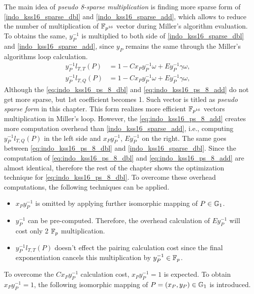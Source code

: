 The main idea of  \textit{pseudo 8-sparse multiplication} is finding more sparse form  of \eqref{indo_kss16_sparse_dbl} and \eqref{indo_kss16_sparse_add}, which allows to reduce the number of multiplication of $\mathbb{F}_{p^{16}}$ vector during Miller's algorithm evaluation.  To obtains the same, $y_P^{-1}$ is multiplied to both side of  \eqref{indo_kss16_sparse_dbl} and \eqref{indo_kss16_sparse_add}, since $y_P$  remains the same through the Miller's algorithms loop calculation.
\begin{subequations}
\begin{eqnarray}
y_{P}^{-1}l_{T,T}(P)& =  1 -Cx_{P}y_{P}^{-1}\omega+E y_{P}^{-1}\gamma \omega,  \label{eq:indo_kss16_ps_8_dbl}\\
y_{P}^{-1}l_{T,Q}(P)& =  1 -Cx_{P}y_{P}^{-1}\omega+E y_{P}^{-1}\gamma \omega, \label{eq:indo_kss16_ps_8_add}
\end{eqnarray}
\end{subequations}
Although the \eqref{eq:indo_kss16_ps_8_dbl} and \eqref{eq:indo_kss16_ps_8_add} do not get more sparse, but 1st coefficient becomes 1. 
Such vector is titled as \textit{pseudo sparse form} in this chapter. This form realizes more efficient $\mathbb{F}_{p^{16}}$ vectors  multiplication in Miller's loop.  
However, the \eqref{eq:indo_kss16_ps_8_add} creates more computation overhead than \eqref{indo_kss16_sparse_add}, i.e., computing $y_{P}^{-1}l_{T,Q}(P)$ in the left side and $x_Py_{P}^{-1}$, $Ey_P^{-1}$ on the right. 
The same goes between \eqref{eq:indo_kss16_ps_8_dbl} and \eqref{indo_kss16_sparse_dbl}. 
Since the computation of \eqref{eq:indo_kss16_ps_8_dbl} and \eqref{eq:indo_kss16_ps_8_add} are almost identical, therefore the rest of the chapter shows the optimization technique for \eqref{eq:indo_kss16_ps_8_dbl}.
To overcome these overhead computations, the following techniques can be applied.
\begin{itemize}
\item $x_{P}y_{P}^{-1}$ is omitted by applying further isomorphic mapping of $P \in {\mathbb{G}}_{1}$.
\item  $y_P^{-1} $ can be pre-computed. Therefore, the overhead calculation of $Ey_P^{-1}$ will cost only 2 ${\mathbb{F}}_{p}$ multiplication.
\item  $y_{P}^{-1}l_{T,T}(P)$  doesn't effect the pairing calculation cost since the final exponentiation cancels this multiplication by $y_{P}^{-1} \in {\mathbb{F}}_{p}$.
\end{itemize}

To overcome the $Cx_{P}y_{P}^{-1}$  calculation cost, $x_{P}y_{P}^{-1} =1 $ is expected. 
To obtain $x_{P}y_{P}^{-1} = 1$, the following isomorphic mapping of $P=(x_P,y_P) \in {\mathbb{G}}_{1}$ is introduced. 


